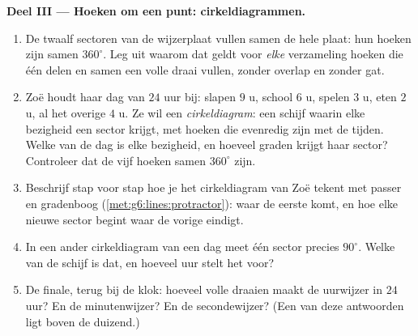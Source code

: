 \begin{problem}
\medskip
\noindent\textbf{Deel III --- Hoeken om een punt: cirkeldiagrammen.}
\begin{enumerate}[resume]
  \item De twaalf sectoren van de wijzerplaat vullen samen de hele plaat: hun
        hoeken zijn samen $360^\circ$. Leg uit waarom dat geldt voor
        \emph{elke} verzameling hoeken die één  delen en samen een
        volle draai vullen, zonder overlap en zonder gat.
  \item Zoë houdt haar dag van $24$ uur bij: slapen $9$ u, school $6$ u,
        spelen $3$ u, eten $2$ u, al het overige $4$ u. Ze wil een
        \emph{cirkeldiagram}: een schijf waarin elke bezigheid een sector
        krijgt, met hoeken die evenredig zijn met de tijden. Welke  van de
        dag is elke bezigheid, en hoeveel graden krijgt haar sector?
        Controleer dat de vijf hoeken samen $360^\circ$ zijn.
  \item Beschrijf stap voor stap hoe je het cirkeldiagram van Zoë tekent met
        passer en gradenboog (\cref{met:g6:lines:protractor}): waar de eerste
         komt, en hoe elke nieuwe sector begint waar de vorige eindigt.
  \item In een ander cirkeldiagram van een dag meet één sector precies
        $90^\circ$. Welke  van de schijf is dat, en hoeveel uur stelt het
        voor?
  \item De finale, terug bij de klok: hoeveel volle draaien maakt de uurwijzer
        in $24$ uur? En de minutenwijzer? En de secondewijzer? (Een van deze
        antwoorden ligt boven de duizend.)
\end{enumerate}
\end{problem}
